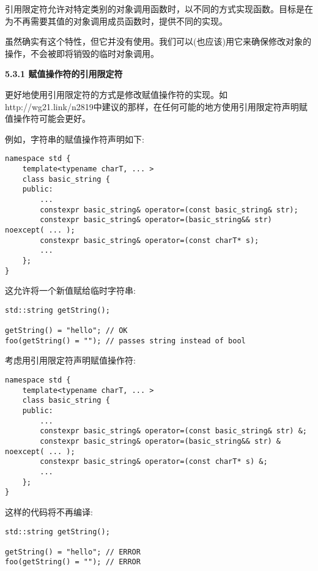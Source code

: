 引用限定符允许对特定类别的对象调用函数时，以不同的方式实现函数。目标是在为不再需要其值的对象调用成员函数时，提供不同的实现。\par

虽然确实有这个特性，但它并没有使用。我们可以(也应该)用它来确保修改对象的操作，不会被即将销毁的临时对象调用。\par

\hspace*{\fill} \par %
\textbf{5.3.1 赋值操作符的引用限定符}

更好地使用引用限定符的方式是修改赋值操作符的实现。如http://wg21.link/n2819中建议的那样，在任何可能的地方使用引用限定符声明赋值操作符可能会更好。\par

例如，字符串的赋值操作符声明如下:\par

\begin{lstlisting}[caption={}]
namespace std {
	template<typename charT, ... >
	class basic_string {
	public:
		...
		constexpr basic_string& operator=(const basic_string& str);
		constexpr basic_string& operator=(basic_string&& str) noexcept( ... );
		constexpr basic_string& operator=(const charT* s);
		...
	};
}
\end{lstlisting}

这允许将一个新值赋给临时字符串:\par

\begin{lstlisting}[caption={}]
std::string getString();

getString() = "hello"; // OK
foo(getString() = ""); // passes string instead of bool
\end{lstlisting}

考虑用引用限定符声明赋值操作符:\par

\begin{lstlisting}[caption={}]
namespace std {
	template<typename charT, ... >
	class basic_string {
	public:
		...
		constexpr basic_string& operator=(const basic_string& str) &;
		constexpr basic_string& operator=(basic_string&& str) & noexcept( ... );
		constexpr basic_string& operator=(const charT* s) &;
		...
	};
}
\end{lstlisting}

这样的代码将不再编译:\par

\begin{lstlisting}[caption={}]
std::string getString();

getString() = "hello"; // ERROR
foo(getString() = ""); // ERROR
\end{lstlisting}

